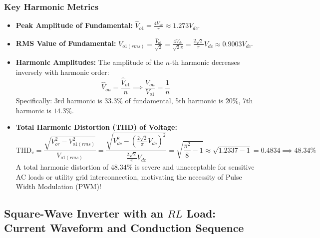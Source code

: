 \documentclass[11pt,a4paper]{article}
\let\origsubsection\subsection
\renewcommand{\subsection}{\Needspace{7\baselineskip}\origsubsection}
\begin{document}
\subsubsection{Key Harmonic Metrics}
\begin{itemize}[leftmargin=*]
  \item \textbf{Peak Amplitude of Fundamental:} $\hat{V}_{o1} = \frac{4V_{dc}}{\pi} \approx 1.273 V_{dc}$.
  \item \textbf{RMS Value of Fundamental:} $V_{o1(rms)} = \frac{\hat{V}_{o1}}{\sqrt{2}} = \frac{4V_{dc}}{\sqrt{2}\pi} = \frac{2\sqrt{2}}{\pi}V_{dc} \approx 0.9003 V_{dc}$.
  \item \textbf{Harmonic Amplitudes:} The amplitude of the $n$-th harmonic decreases inversely with harmonic order:
  \begin{equation}
  \hat{V}_{on} = \frac{\hat{V}_{o1}}{n} \implies \frac{V_{on}}{V_{o1}} = \frac{1}{n}
  \end{equation}
  Specifically: 3rd harmonic is $33.3\%$ of fundamental, 5th harmonic is $20\%$, 7th harmonic is $14.3\%$.
  \item \textbf{Total Harmonic Distortion (THD) of Voltage:}
  \begin{equation}
  \text{THD}_v = \frac{\sqrt{V_{or}^2 - V_{o1(rms)}^2}}{V_{o1(rms)}} = \frac{\sqrt{V_{dc}^2 - \left(\frac{2\sqrt{2}}{\pi}V_{dc}\right)^2}}{\frac{2\sqrt{2}}{\pi}V_{dc}} = \sqrt{\frac{\pi^2}{8} - 1} \approx \sqrt{1.2337 - 1} = 0.4834 \implies 48.34\%
  \end{equation}
  A total harmonic distortion of $48.34\%$ is severe and unacceptable for sensitive AC loads or utility grid interconnection, motivating the necessity of Pulse Width Modulation (PWM)!
\end{itemize}

\subsection{Square-Wave Inverter with an $RL$ Load: Current Waveform and Conduction Sequence}
\end{document}
